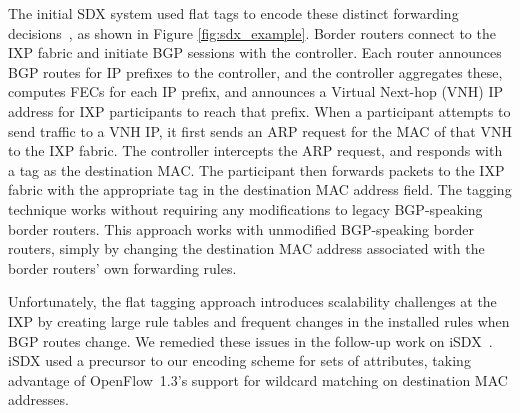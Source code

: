 The initial SDX system used flat tags to encode these distinct
forwarding decisions~\cite{sdx}, as shown in Figure
\ref{fig:sdx_example}. Border routers connect to the IXP fabric and
initiate BGP sessions with the controller. Each router announces BGP
routes for IP prefixes to the controller, and the controller aggregates
these, computes FECs for each IP prefix, and announces a Virtual
Next-hop (VNH) IP address for IXP participants to reach that
prefix. When a participant attempts to send traffic to a VNH IP, it
first sends an ARP request for the MAC of that VNH to the IXP
fabric. The controller intercepts the ARP request, and responds with a
tag as the destination MAC. The participant then forwards packets to the
IXP fabric with the appropriate tag in the destination MAC address
field.  The tagging technique works without requiring any modifications
to legacy BGP-speaking border routers.
This approach works with
unmodified BGP-speaking border routers, simply by changing the
destination MAC address associated with the border routers' own
forwarding rules.

Unfortunately, the flat tagging approach introduces scalability challenges
at the IXP by creating large rule tables and frequent changes in the
installed rules when BGP routes change.  We remedied these issues in
the follow-up work on iSDX~\cite{isdx}. iSDX used a precursor to our
encoding scheme for sets of attributes, taking advantage of
OpenFlow~1.3's support for wildcard matching on destination MAC
addresses. 

